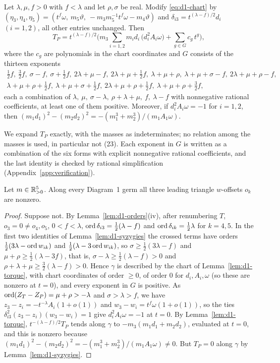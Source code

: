 \begin{lemma}\label{lem:d1-torque}
Let $\lambda,\mu,f>0$ with $f<\lambda$ and let $\rho,\sigma$ be real.  Modify
\eqref{eq:d1-chart} by $(\eta_3,\eta_4,\eta_5)=(t^f\omega,\ m_5\vartheta,\
-m_3m_5^{-1}t^f\omega-m_4\vartheta)$ and $\delta_{i3}=t^{(\lambda-f)/2}d_i$ $(i=1,2)$, all other
entries unchanged.  Then
\[
  T_P=t^{(\lambda-f)/2}\Big(m_3\sum_{i=1,2}m_id_i\,\big(d_i^2A_i\omega\big)+\sum_{g\in G}c_g\,t^g\Big),
\]
where the $c_g$ are polynomials in the chart coordinates and $G$ consists of the thirteen
exponents
\[
\begin{gathered}
  \tfrac12f,\ \tfrac32f,\ \sigma-f,\ \sigma+\tfrac12f,\ 2\lambda+\mu-f,\
  2\lambda+\mu+\tfrac12f,\ \lambda+\mu+\rho,\ \lambda+\mu+\sigma-f,\ 2\lambda+\mu+\rho-f,\\
  \lambda+\mu+\rho+\tfrac12f,\ \lambda+\mu+\sigma+\tfrac12f,\ 2\lambda+\mu+\rho+\tfrac12f,\
  \lambda+\mu+\rho+\tfrac32f,
\end{gathered}
\]
each a combination of $\lambda,\ \mu,\ \sigma-\lambda,\ \rho+\lambda+\mu,\ f,\ \lambda-f$ with
nonnegative rational coefficients, at least one of them positive.  Moreover, if
$d_i^2A_i\omega=-1$ for $i=1,2$, then $(m_1d_1)^2-(m_2d_2)^2=-(m_1^3+m_2^3)/(m_1A_1\omega)$.
\end{lemma}
We expand $T_P$ exactly, with the masses as indeterminates; no relation among the masses is used,
in particular not (23).  Each exponent in $G$ is written as a combination of the six forms with
explicit nonnegative rational coefficients, and the last identity is checked by rational
simplification (Appendix~\ref{app:verification}).

\begin{lemma}\label{lem:d1-central}
Let $m\in\mathbb{R}_{>0}^5$.  Along every Diagram~1 germ all three leading triangle $w$-offsets $o_k$ are
nonzero.
\end{lemma}

\begin{proof}
Suppose not.  By Lemma~\ref{lem:d1-orders}(iv), after renumbering $T$, $o_3=0\ne o_4,o_5$,
$0<f<\lambda$, $\operatorname{ord}\delta_{i3}=\frac12(\lambda-f)$ and $\operatorname{ord}\delta_{ik}=\frac12\lambda$ for $k=4,5$.
In the first two identities of Lemma~\ref{lem:d1-syzygies} the crossed terms have orders
$\frac12(3\lambda-\operatorname{ord} w_{ik})$ and $\frac12(\lambda-3\operatorname{ord} w_{ik})$, so
$\sigma\ge\frac12(3\lambda-f)$ and $\mu+\rho\ge\frac12(\lambda-3f)$, that is,
$\sigma-\lambda\ge\frac12(\lambda-f)>0$ and $\rho+\lambda+\mu\ge\frac32(\lambda-f)>0$.
Hence $\gamma$ is described by the chart of Lemma~\ref{lem:d1-torque}, with chart coordinates of
order $\ge0$, of order $0$ for $d_i,A_i,\omega$ (so these are nonzero at $t=0$), and every
exponent in $G$ is positive.
As $\operatorname{ord}(Z_T-Z_P)=\mu+\rho>-\lambda$ and $\sigma>\lambda>f$, we have $z_3-z_i=-t^{-\lambda}A_i(1+o(1))$
and $w_3-w_i=t^f\omega(1+o(1))$, so the ties $\delta_{i3}^2(z_3-z_i)(w_3-w_i)=1$ give
$d_i^2A_i\omega=-1$ at $t=0$.
By Lemma~\ref{lem:d1-torque}, $t^{-(\lambda-f)/2}T_P$ tends along $\gamma$ to
$-m_3(m_1d_1+m_2d_2)$, evaluated at $t=0$, and this is nonzero because
$(m_1d_1)^2-(m_2d_2)^2=-(m_1^3+m_2^3)/(m_1A_1\omega)\ne0$.  But $T_P=0$ along $\gamma$ by
Lemma~\ref{lem:d1-syzygies}.
\end{proof}

